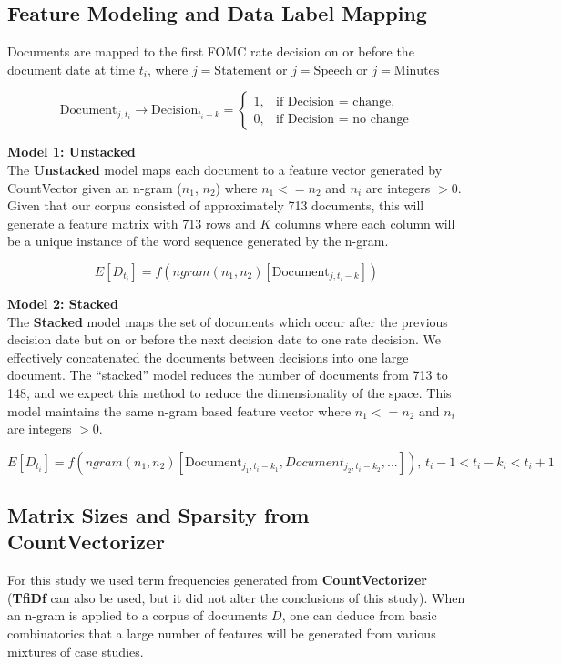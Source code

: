 \documentclass[11pt]{article}
\newcommand{\vertSpace}[1]{\vspace{3mm}}
\begin{document}
{\subsection{Feature Modeling and Data Label Mapping}
\noindent Documents are mapped to the first FOMC rate decision on or before the document date at time $t_i$, where $j=\text{Statement}$ or $j=\text{Speech}$ or $j=\text{Minutes}$

\begin{equation*}
\mbox{Document}_{j,t_i} \rightarrow \mbox{Decision}_{t_i+k}
 = \begin{cases}
  1, & \text{if  Decision = change}, \\
  0, & \text{if  Decision = no change}
\end{cases}
\end{equation*}

\noindent 
\textbf{Model 1: Unstacked}\\
\noindent
The \textbf{Unstacked} model maps each document to a feature vector generated by CountVector given an n-gram ($n_1$, $n_2$) where $n_1 <= n_2$ and $n_i$ are integers $>0$.  Given that our corpus consisted of approximately 713 documents, this will generate a feature matrix with 713 rows and $K$ columns where each column will be a unique instance of the word sequence generated by the n-gram.

$$E[D_{t_i}] = f(ngram(n_1, n_2)[\mbox{Document}_{j,t_i-k}])$$

\noindent
\textbf{Model 2: Stacked}\\
The \textbf{Stacked} model maps the set of documents which occur after the previous decision date but on or before the next decision date to one rate decision.  We effectively concatenated the documents between decisions into one large document.  The ``stacked'' model reduces the number of documents from 713 to 148, and we expect this method to reduce the dimensionality of the space.  This model maintains the same n-gram based feature vector where $n_1 <= n_2$ and $n_i$ are integers $>0$.

$$E[D_{t_i}] = f(ngram(n_1, n_2)[\mbox{Document}_{j_1,t_i-k_1},{Document}_{j_2,t_i-k_2},...]) \text{, } t_i-1 < t_i-k_i < t_i+1$$

\subsection{Matrix Sizes and Sparsity from CountVectorizer}

\noindent For this study we used term frequencies generated from \textbf{CountVectorizer} (\textbf{TfiDf} can also be used, but it did not alter the conclusions of this study).  When an n-gram is applied to a corpus of documents $D$, one can deduce from basic combinatorics that a large number of features will be generated from various mixtures of case studies.  \vertSpace


}
\end{document}
